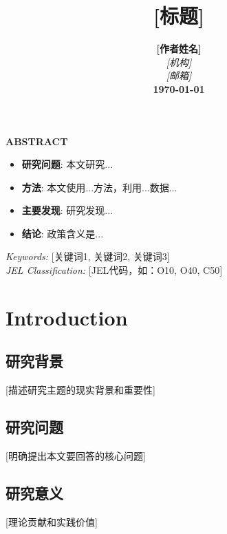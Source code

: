 \documentclass[a4paper,12pt]{article}
\title{\textbf{[标题]}\\}
\author{
\textbf{[作者姓名]}\\[1ex]
\textit{[机构]}\\[1ex]
\textit{[邮箱]}\\[2ex]
\textbf{\today}
}
\date{}
\numberwithin{equation}{section}
\begin{document}
\maketitle
\thispagestyle{empty}

\vspace{-2ex}
\begin{center}
\textbf{ABSTRACT}
\end{center}
\vspace{-1ex}


\begin{itemize}
    \item \textbf{研究问题}: 本文研究...
    \item \textbf{方法}: 本文使用...方法，利用...数据...
    \item \textbf{主要发现}: 研究发现...
    \item \textbf{结论}: 政策含义是...
\end{itemize}

\vspace{1ex}
\noindent
\textit{Keywords:} [关键词1, 关键词2, 关键词3] \\
\textit{JEL Classification:} [JEL代码，如：O10, O40, C50]

\newpage

\section{Introduction}
\label{sec:intro}

\subsection{研究背景}
[描述研究主题的现实背景和重要性]

\subsection{研究问题}
[明确提出本文要回答的核心问题]

\subsection{研究意义}
[理论贡献和实践价值]
\end{document}
